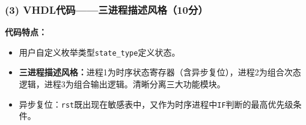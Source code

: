 
\subsubsection*{(3) VHDL代码——三进程描述风格（10分）}

\noindent\textbf{代码特点：}
\begin{itemize}
  \item 用户自定义枚举类型\texttt{state\_type}定义状态。
  \item \textbf{三进程描述风格：}进程1为时序状态寄存器（含异步复位），进程2为组合次态逻辑，进程3为组合输出逻辑。清晰分离三大功能模块。
  \item 异步复位：\texttt{rst}既出现在敏感表中，又作为时序进程中\texttt{IF}判断的最高优先级条件。
\end{itemize}

